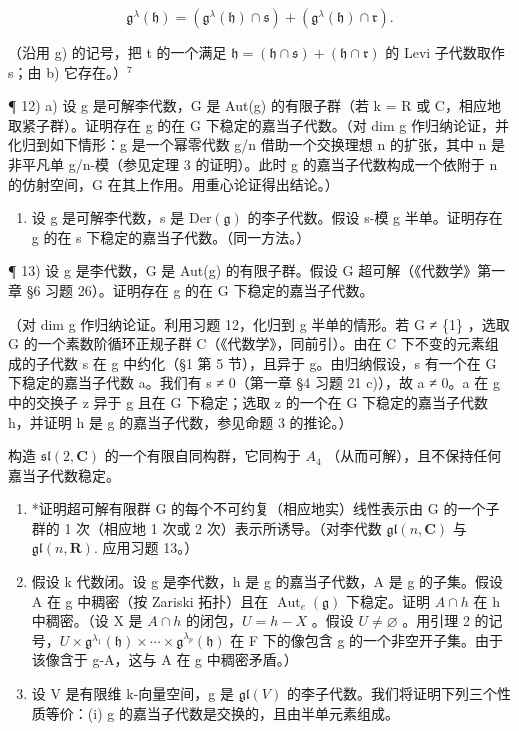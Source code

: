 \[
\mathfrak {g} ^ {\lambda} (\mathfrak {h}) = \left(\mathfrak {g} ^ {\lambda} (\mathfrak {h}) \cap \mathfrak {s}\right) + \left(\mathfrak {g} ^ {\lambda} (\mathfrak {h}) \cap \mathfrak {r}\right).
\]

（沿用 g) 的记号，把 t 的一个满足 \(\mathfrak{h} = (\mathfrak{h} \cap \mathfrak{s}) + (\mathfrak{h} \cap \mathfrak{r})\) 的 Levi 子代数取作 s；由 b) 它存在。）\(^{7}\)

¶ 12) a) 设 g 是可解李代数，G 是 Aut(g) 的有限子群（若 k = R 或 C，相应地取紧子群）。证明存在 g 的在 G 下稳定的嘉当子代数。（对 dim g 作归纳论证，并化归到如下情形：g 是一个幂零代数 g/n 借助一个交换理想 n 的扩张，其中 n 是非平凡单 g/n-模（参见定理 3 的证明）。此时 g 的嘉当子代数构成一个依附于 n 的仿射空间，G 在其上作用。用重心论证得出结论。）

\begin{enumerate}
\def\labelenumi{\alph{enumi})}
\setcounter{enumi}{1}
\tightlist
\item
  设 g 是可解李代数，s 是 \(\text{Der}(\mathfrak{g})\) 的李子代数。假设 s-模 g 半单。证明存在 g 的在 s 下稳定的嘉当子代数。（同一方法。）
\end{enumerate}

¶ 13) 设 g 是李代数，G 是 Aut(g) 的有限子群。假设 G 超可解（《代数学》第一章 §6 习题 26）。证明存在 g 的在 G 下稳定的嘉当子代数。

（对 dim g 作归纳论证。利用习题 12，化归到 g 半单的情形。若 G ≠ \{1\} ，选取 G 的一个素数阶循环正规子群 C（《代数学》，同前引）。由在 C 下不变的元素组成的子代数 s 在 g 中约化（§1 第 5 节），且异于 g。由归纳假设，s 有一个在 G 下稳定的嘉当子代数 a。我们有 s ≠ 0（第一章 §4 习题 21 c)），故 a ≠ 0。a 在 g 中的交换子 z 异于 g 且在 G 下稳定；选取 z 的一个在 G 下稳定的嘉当子代数 h，并证明 h 是 g 的嘉当子代数，参见命题 3 的推论。）

构造 \(\mathfrak{sl}(2,\mathbf{C})\) 的一个有限自同构群，它同构于 \(A_{4}\) （从而可解），且不保持任何嘉当子代数稳定。

\begin{enumerate}
\def\labelenumi{\arabic{enumi})}
\setcounter{enumi}{13}
\item
  *证明超可解有限群 G 的每个不可约复（相应地实）线性表示由 G 的一个子群的 1 次（相应地 1 次或 2 次）表示所诱导。（对李代数 \(\mathfrak{gl}(n,\mathbf{C})\) 与 \(\mathfrak{gl}(n,\mathbf{R}).\) 应用习题 13。）
\item
  假设 k 代数闭。设 g 是李代数，h 是 g 的嘉当子代数，A 是 g 的子集。假设 A 在 g 中稠密（按 Zariski 拓扑）且在 \(\operatorname{Aut}_{e}(\mathfrak{g})\) 下稳定。证明 \(A \cap h\) 在 h 中稠密。（设 X 是 \(A \cap h\) 的闭包，\(U = h - X\) 。假设 \(U \neq \varnothing\) 。用引理 2 的记号，\(U \times \mathfrak{g}^{\lambda_{1}}(\mathfrak{h}) \times \cdots \times \mathfrak{g}^{\lambda_{p}}(\mathfrak{h})\) 在 F 下的像包含 g 的一个非空开子集。由于该像含于 g-A，这与 A 在 g 中稠密矛盾。）
\item
  设 V 是有限维 k-向量空间，g 是 \(\mathfrak{gl}(V)\) 的李子代数。我们将证明下列三个性质等价：(i) g 的嘉当子代数是交换的，且由半单元素组成。
\end{enumerate}

